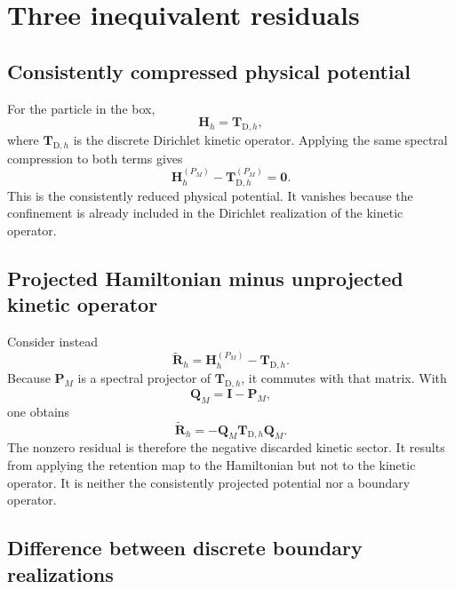 \section*{Three inequivalent residuals}

\subsection*{Consistently compressed physical potential}

For the particle in the box,
\begin{equation}
    \mathbf H_h=\mathbf T_{\mathrm D,h},
\end{equation}
where $\mathbf T_{\mathrm D,h}$ is the discrete Dirichlet kinetic operator.
Applying the same spectral compression to both terms gives
\begin{equation}
    \mathbf H_h^{(P_M)}
    -
    \mathbf T_{\mathrm D,h}^{(P_M)}
    =
    \mathbf 0.
\end{equation}
This is the consistently reduced physical potential. It vanishes because the
confinement is already included in the Dirichlet realization of the kinetic
operator.

\subsection*{Projected Hamiltonian minus unprojected kinetic operator}

Consider instead
\begin{equation}
    \widetilde{\mathbf R}_h
    =
    \mathbf H_h^{(P_M)}
    -
    \mathbf T_{\mathrm D,h}.
\end{equation}
Because $\mathbf P_M$ is a spectral projector of
$\mathbf T_{\mathrm D,h}$, it commutes with that matrix. With
\begin{equation}
    \mathbf Q_M=\mathbf I-\mathbf P_M,
\end{equation}
one obtains
\begin{equation}
    \widetilde{\mathbf R}_h
    =
    -\mathbf Q_M
    \mathbf T_{\mathrm D,h}
    \mathbf Q_M.
\end{equation}
The nonzero residual is therefore the negative discarded kinetic sector. It
results from applying the retention map to the Hamiltonian but not to the
kinetic operator. It is neither the consistently projected potential nor a
boundary operator.

\subsection*{Difference between discrete boundary realizations}

